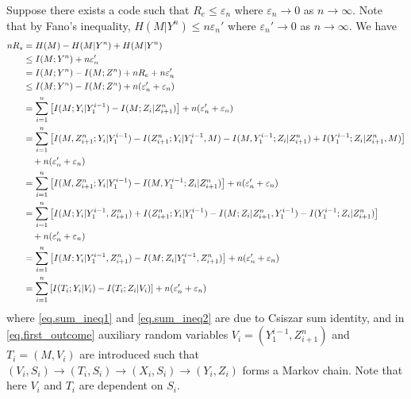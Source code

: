 \documentclass[12pt, Draft, onecolumn]{IEEEtran}
\begin{document}
Suppose there exists a code such that $R_e\leq \varepsilon_n$ where $\varepsilon_n\rightarrow 0$ as $n\rightarrow \infty$. Note that by Fano's inequality, $H(M|Y^n)\leq n\varepsilon_n'$ where $\varepsilon_n'\rightarrow 0$ as $n\rightarrow \infty$. We have
\begin{align}
nR_s &= H(M)-H(M|Y^n) +H(M|Y^n)\notag\\
&\leq I(M;Y^n) + n\varepsilon_n'\notag\\
&= I(M;Y^n)-I(M;Z^n) +nR_e+n\varepsilon_n'\notag\\
&\leq  I(M;Y^n)-I(M;Z^n) +n(\varepsilon_n'+\varepsilon_n)\notag\\
&= \sum_{i=1}^n \left[I(M;Y_i|Y_1^{i-1})-I(M;Z_i|Z_{i+1}^n)\right]+n(\varepsilon_n'+\varepsilon_n)\notag\\
&= \sum_{i=1}^n \left[I(M,Z_{i+1}^n;Y_i|Y_1^{i-1})-I(Z_{i+1}^n;Y_i|Y_1^{i-1},M)-I(M,Y_1^{i-1};Z_i|Z_{i+1}^n)+I(Y_1^{i-1};Z_i|Z_{i+1}^n,M)\right]\notag\\
&\quad+n(\varepsilon_n'+\varepsilon_n)\notag\\
\label{eq.sum_ineq1}
&= \sum_{i=1}^n \left[I(M,Z_{i+1}^n;Y_i|Y_1^{i-1})-I(M,Y_1^{i-1};Z_i|Z_{i+1}^n)\right]+n(\varepsilon_n'+\varepsilon_n)\\
&= \sum_{i=1}^n \left[I(M;Y_i|Y_1^{i-1},Z_{i+1}^n)+I(Z_{i+1}^n;Y_i|Y_1^{i-1})-I(M;Z_i|Z_{i+1}^n,Y_1^{i-1})-I(Y_1^{i-1};Z_i|Z_{i+1}^n)\right]\notag\\
&\quad+n(\varepsilon_n'+\varepsilon_n)\notag\\
\label{eq.sum_ineq2}
&= \sum_{i=1}^n \left[I(M;Y_i|Y_1^{i-1},Z_{i+1}^n)-I(M;Z_i|Y_1^{i-1},Z_{i+1}^n)\right]+n(\varepsilon_n'+\varepsilon_n)\\
\label{eq.first_outcome}
&= \sum_{i=1}^n \left[I(T_i;Y_i|V_i)-I(T_i;Z_i|V_i)\right]+n(\varepsilon_n'+\varepsilon_n)
\end{align}
where \eqref{eq.sum_ineq1} and \eqref{eq.sum_ineq2} are due to Csiszar sum identity, and in \eqref{eq.first_outcome} auxiliary random variables $V_i = (Y_1^{i-1},Z_{i+1}^n)$ and $T_i = (M,V_i)$ are introduced such that $(V_i,S_i)\rightarrow (T_i,S_i)\rightarrow (X_i,S_i)  \rightarrow (Y_i,Z_i)$ forms a Markov chain. Note that here $V_i$ and $T_i$ are dependent on $S_i$.

\end{document}
